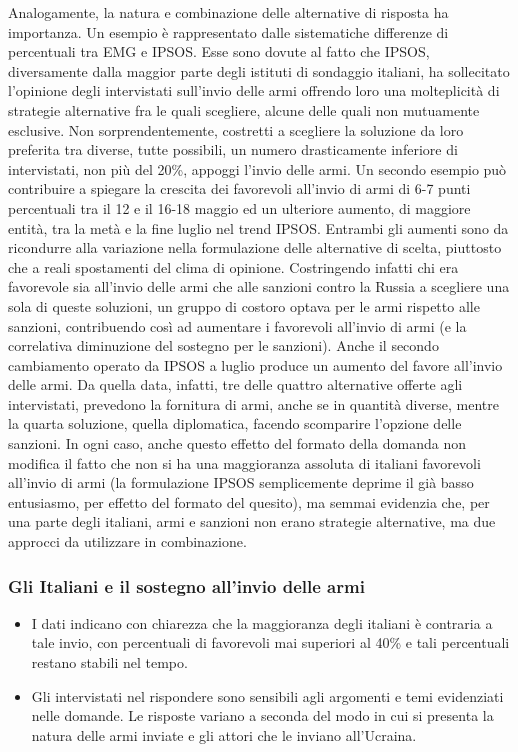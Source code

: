 \documentclass[
]{book}
\begin{document}
Analogamente, la natura e combinazione delle alternative di risposta ha importanza. Un esempio è rappresentato dalle sistematiche differenze di percentuali tra EMG e IPSOS. Esse sono dovute al fatto che IPSOS, diversamente dalla maggior parte degli istituti di sondaggio italiani, ha sollecitato l'opinione degli intervistati sull'invio delle armi offrendo loro una molteplicità di strategie alternative fra le quali scegliere, alcune delle quali non mutuamente esclusive. Non sorprendentemente, costretti a scegliere la soluzione da loro preferita tra diverse, tutte possibili, un numero drasticamente inferiore di intervistati, non più del 20\%, appoggi l'invio delle armi. Un secondo esempio può contribuire a spiegare la crescita dei favorevoli all'invio di armi di 6-7 punti percentuali tra il 12 e il 16-18 maggio ed un ulteriore aumento, di maggiore entità, tra la metà e la fine luglio nel trend IPSOS. Entrambi gli aumenti sono da ricondurre alla variazione nella formulazione delle alternative di scelta, piuttosto che a reali spostamenti del clima di opinione. Costringendo infatti chi era favorevole sia all'invio delle armi che alle sanzioni contro la Russia a scegliere una sola di queste soluzioni, un gruppo di costoro optava per le armi rispetto alle sanzioni, contribuendo così ad aumentare i favorevoli all'invio di armi (e la correlativa diminuzione del sostegno per le sanzioni). Anche il secondo cambiamento operato da IPSOS a luglio produce un aumento del favore all'invio delle armi. Da quella data, infatti, tre delle quattro alternative offerte agli intervistati, prevedono la fornitura di armi, anche se in quantità diverse, mentre la quarta soluzione, quella diplomatica, facendo scomparire l'opzione delle sanzioni. In ogni caso, anche questo effetto del formato della domanda non modifica il fatto che non si ha una maggioranza assoluta di italiani favorevoli all'invio di armi (la formulazione IPSOS semplicemente deprime il già basso entusiasmo, per effetto del formato del quesito), ma semmai evidenzia che, per una parte degli italiani, armi e sanzioni non erano strategie alternative, ma due approcci da utilizzare in combinazione.

\hypertarget{gli-italiani-e-il-sostegno-allinvio-delle-armi}{%
\subsubsection{Gli Italiani e il sostegno all'invio delle armi}\label{gli-italiani-e-il-sostegno-allinvio-delle-armi}}

\begin{itemize}
\item
  I dati indicano con chiarezza che la maggioranza degli italiani è contraria a tale invio, con percentuali di favorevoli mai superiori al 40\% e tali percentuali restano stabili nel tempo.
\item
  Gli intervistati nel rispondere sono sensibili agli argomenti e temi evidenziati nelle domande. Le risposte variano a seconda del modo in cui si presenta la natura delle armi inviate e gli attori che le inviano all'Ucraina.
\end{itemize}
\end{document}

